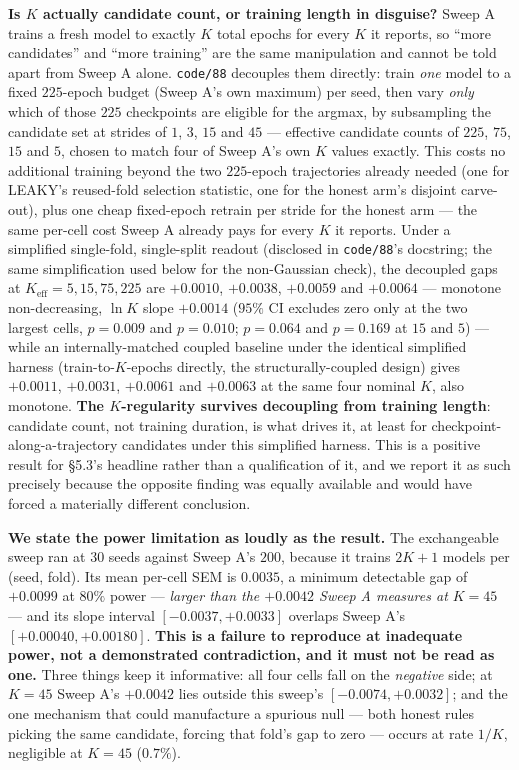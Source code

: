 \documentclass[10pt]{article} %
\begin{document}
\textbf{Is $K$ actually candidate count, or training length in disguise?}
Sweep A trains a fresh model to exactly $K$ total epochs for every $K$ it
reports, so ``more candidates'' and ``more training'' are the same
manipulation and cannot be told apart from Sweep A alone. \texttt{code/88}
decouples them directly: train \emph{one} model to a fixed $225$-epoch budget
(Sweep A's own maximum) per seed, then vary \emph{only} which of those $225$
checkpoints are eligible for the argmax, by subsampling the candidate set at
strides of $1$, $3$, $15$ and $45$ --- effective candidate counts of $225$,
$75$, $15$ and $5$, chosen to match four of Sweep A's own $K$ values exactly.
This costs no additional training beyond the two $225$-epoch trajectories
already needed (one for LEAKY's reused-fold selection statistic, one for the
honest arm's disjoint carve-out), plus one cheap fixed-epoch retrain per
stride for the honest arm --- the same per-cell cost Sweep A already pays for
every $K$ it reports. Under a simplified single-fold, single-split readout
(disclosed in \texttt{code/88}'s docstring; the same simplification used
below for the non-Gaussian check), the decoupled gaps at $K_{\text{eff}}=5,
15, 75, 225$ are $+0.0010$, $+0.0038$, $+0.0059$ and $+0.0064$ --- monotone
non-decreasing, $\ln K$ slope $+0.0014$ ($95\%$ CI excludes zero only at the
two largest cells, $p=0.009$ and $p=0.010$; $p=0.064$ and $p=0.169$ at $15$
and $5$) --- while an internally-matched coupled baseline under the identical
simplified harness (train-to-$K$-epochs directly, the structurally-coupled
design) gives $+0.0011$, $+0.0031$, $+0.0061$ and $+0.0063$ at the same four
nominal $K$, also monotone. \textbf{The $K$-regularity survives decoupling
from training length}: candidate count, not training duration, is what drives
it, at least for checkpoint-along-a-trajectory candidates under this
simplified harness. This is a positive result for \S5.3's headline rather
than a qualification of it, and we report it as such precisely because the
opposite finding was equally available and would have forced a materially
different conclusion.

\textbf{We state the power limitation as loudly as the result.} The
exchangeable sweep ran at $30$ seeds against Sweep A's $200$, because it trains
$2K+1$ models per (seed, fold). Its mean per-cell SEM is $0.0035$, a minimum
detectable gap of $\mathbf{+0.0099}$ at $80\%$ power --- \emph{larger than the
$+0.0042$ Sweep A measures at $K=45$} --- and its slope interval
$[-0.0037,+0.0033]$ overlaps Sweep A's $[+0.00040,+0.00180]$. \textbf{This is a
failure to reproduce at inadequate power, not a demonstrated contradiction, and
it must not be read as one.} Three things keep it informative: all four cells
fall on the \emph{negative} side; at $K=45$ Sweep A's $+0.0042$ lies outside
this sweep's $[-0.0074,+0.0032]$; and the one mechanism that could manufacture
a spurious null --- both honest rules picking the same candidate, forcing that
fold's gap to zero --- occurs at rate $1/K$, negligible at $K=45$ ($0.7\%$).
\end{document}
